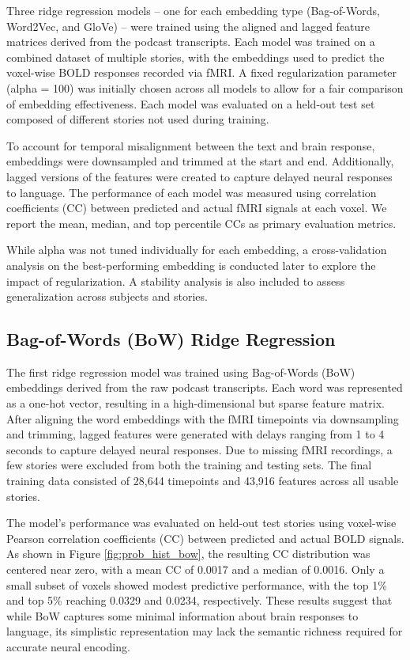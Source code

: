 \documentclass[11pt,letterpaper]{article}
\begin{document}
Three ridge regression models -- one for each embedding type (Bag-of-Words, Word2Vec, and GloVe) -- were trained using the aligned and lagged feature matrices derived from the podcast transcripts. Each model was trained on a combined dataset of multiple stories, with the embeddings used to predict the voxel-wise BOLD responses recorded via fMRI. A fixed regularization parameter (alpha = 100) was initially chosen across all models to allow for a fair comparison of embedding effectiveness. Each model was evaluated on a held-out test set composed of different stories not used during training.

To account for temporal misalignment between the text and brain response, embeddings were downsampled and trimmed at the start and end. Additionally, lagged versions of the features were created to capture delayed neural responses to language. The performance of each model was measured using correlation coefficients (CC) between predicted and actual fMRI signals at each voxel. We report the mean, median, and top percentile CCs as primary evaluation metrics.

While alpha was not tuned individually for each embedding, a cross-validation analysis on the best-performing embedding is conducted later to explore the impact of regularization. A stability analysis is also included to assess generalization across subjects and stories.

\vspace{1em} %
\subsection{Bag-of-Words (BoW) Ridge Regression}
\vspace{0.5em} %

The first ridge regression model was trained using Bag-of-Words (BoW) embeddings derived from the raw podcast transcripts. Each word was represented as a one-hot vector, resulting in a high-dimensional but sparse feature matrix. After aligning the word embeddings with the fMRI timepoints via downsampling and trimming, lagged features were generated with delays ranging from 1 to 4 seconds to capture delayed neural responses. Due to missing fMRI recordings, a few stories were excluded from both the training and testing sets. The final training data consisted of 28,644 timepoints and 43,916 features across all usable stories.

The model's performance was evaluated on held-out test stories using voxel-wise Pearson correlation coefficients (CC) between predicted and actual BOLD signals. As shown in Figure \ref{fig:prob_hist_bow}, the resulting CC distribution was centered near zero, with a mean CC of 0.0017 and a median of 0.0016. Only a small subset of voxels showed modest predictive performance, with the top 1\% and top 5\% reaching 0.0329 and 0.0234, respectively. These results suggest that while BoW captures some minimal information about brain responses to language, its simplistic representation may lack the semantic richness required for accurate neural encoding.
\end{document}
